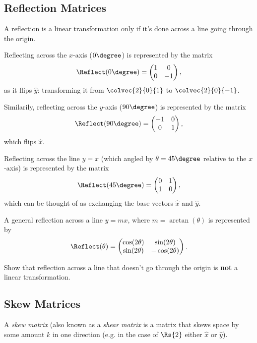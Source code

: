 \subsection{Reflection Matrices}
A reflection is a linear transformation only if it's done across a line going through the origin.

Reflecting across the $x$-axis ($0\degree$) is represented by the matrix
\begin{equation*}
  \Reflect(0\degree) = \begin{pmatrix} 1 & 0 \\ 0 & -1 \end{pmatrix},
\end{equation*}
as it flips $\hat{y}$: transforming it from $\colvec{2}{0}{1}$ to $\colvec{2}{0}{-1}$.

Similarily, reflecting across the $y$-axis ($90\degree$) is represented by the matrix
\begin{equation*}
  \Reflect(90\degree) = \begin{pmatrix} -1 & 0 \\ 0 & 1 \end{pmatrix},
\end{equation*}
which flips $\hat{x}$.

Reflecting across the line $y=x$ (which angled by $\theta=45\degree$ relative to the $x$-axis) is represented by the matrix
\begin{equation*}
  \Reflect(45\degree) = \begin{pmatrix} 0 & 1 \\ 1 & 0 \end{pmatrix},
\end{equation*}
which can be thought of as exchanging the base vectors $\hat{x}$ and $\hat{y}$.

A general reflection across a line $y=mx$, where $m=\arctan(\theta)$ is represented by
\begin{equation*}
  \Reflect(\theta) = \begin{pmatrix} \cos(2\theta) & \sin(2\theta) \\ \sin(2\theta) & -\cos(2\theta) \end{pmatrix}.
\end{equation*}

\begin{challange}
	Show that reflection across a line that doesn't go through the origin is \textbf{not} a linear transformation.
\end{challange}

\subsection{Skew Matrices}
A \emph{skew matrix} (also known as a \emph{shear matrix} is a matrix that skews space by some amount $k$ in one direction (e.g. in the case of $\Rs{2}$ either $\hat{x}$ or $\hat{y}$).

